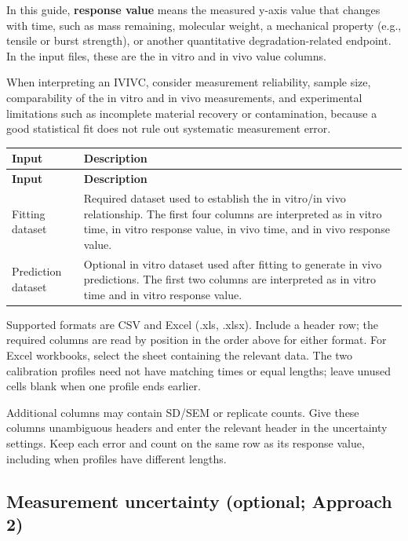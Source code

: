 In this guide, \textbf{response value} means the measured y-axis value that changes with time, such as mass remaining, molecular weight, a mechanical property (e.g., tensile or burst strength), or another quantitative degradation-related endpoint. In the input files, these are the in vitro and in vivo value columns.

When interpreting an IVIVC, consider measurement reliability, sample size, comparability of the in vitro and in vivo measurements, and experimental limitations such as incomplete material recovery or contamination, because a good statistical fit does not rule out systematic measurement error.

\begin{longtable}{@{}>{\raggedright\arraybackslash}p{}>{\raggedright\arraybackslash}p{}@{}}
\toprule
\textbf{Input} & \textbf{Description} \\
\midrule
\endfirsthead
\toprule
\textbf{Input} & \textbf{Description} \\
\midrule
\endhead
Fitting dataset & Required dataset used to establish the in vitro/in vivo relationship. The first four columns are interpreted as in vitro time, in vitro response value, in vivo time, and in vivo response value. \\
Prediction dataset & Optional in vitro dataset used after fitting to generate in vivo predictions. The first two columns are interpreted as in vitro time and in vitro response value. \\
\bottomrule
\end{longtable}

Supported formats are CSV and Excel (.xls, .xlsx). Include a header row; the required columns are read by position in the order above for either format. For Excel workbooks, select the sheet containing the relevant data. The two calibration profiles need not have matching times or equal lengths; leave unused cells blank when one profile ends earlier.

Additional columns may contain SD/SEM or replicate counts. Give these columns unambiguous headers and enter the relevant header in the uncertainty settings. Keep each error and count on the same row as its response value, including when profiles have different lengths.

\subsection{Measurement uncertainty (optional; Approach 2)}
\label{sec:measurement-uncertainty}

